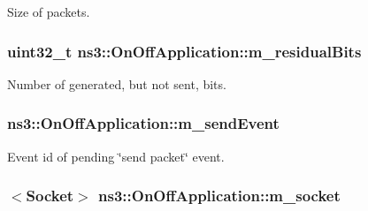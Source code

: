 Size of packets. 

\subsubsection[{\texorpdfstring{m\+\_\+residual\+Bits}{m_residualBits}}]{\setlength{\rightskip}{0pt plus 5cm}uint32\+\_\+t ns3\+::\+On\+Off\+Application\+::m\+\_\+residual\+Bits\hspace{0.3cm}{\ttfamily [private]}}\hypertarget{classns3_1_1OnOffApplication_a0c9bb1d89244488cd37b4a77ce4bcb45}{}\label{classns3_1_1OnOffApplication_a0c9bb1d89244488cd37b4a77ce4bcb45}


Number of generated, but not sent, bits. 

\subsubsection[{\texorpdfstring{m\+\_\+send\+Event}{m_sendEvent}}]{ ns3\+::\+On\+Off\+Application\+::m\+\_\+send\+Event\hspace{0.3cm}{\ttfamily [private]}}\hypertarget{classns3_1_1OnOffApplication_a1484aba0405bef3aaf9f7904764c50f4}{}\label{classns3_1_1OnOffApplication_a1484aba0405bef3aaf9f7904764c50f4}


Event id of pending \char`\"{}send packet\char`\"{} event. 

\subsubsection[{\texorpdfstring{m\+\_\+socket}{m_socket}}]{$<${\bf Socket}$>$ ns3\+::\+On\+Off\+Application\+::m\+\_\+socket\hspace{0.3cm}{\ttfamily [private]}}\hypertarget{classns3_1_1OnOffApplication_a287a8fccd676716df73ed4f207ed5c58}{}\label{classns3_1_1OnOffApplication_a287a8fccd676716df73ed4f207ed5c58}


